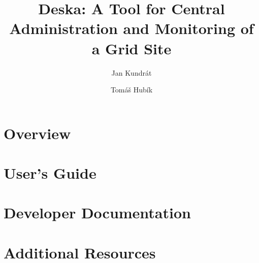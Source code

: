 \documentclass{book}
\begin{document}
\title{Deska: A Tool for Central Administration and Monitoring of a Grid Site}

\author{Jan Kundrát \and Tomáš Hubík}

\maketitle

\setcounter{tocdepth}{3}
\tableofcontents

\part{Overview}



\part{User's Guide}






\part{Developer Documentation}











\part{Additional Resources}





\end{document}
